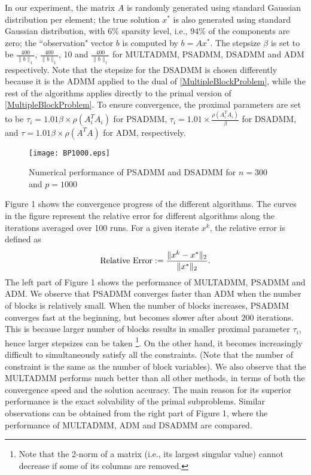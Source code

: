 \documentclass{mcom-l}
\theoremstyle{definition}
\theoremstyle{remark}
\numberwithin{equation}{section}
\begin{document}
In our experiment, the matrix $A$ is randomly generated using standard Gaussian
distribution per element; the true solution $x^*$ is also generated
using standard Gaussian distribution, with $6\%$ sparsity level,
i.e., $94\%$ of the components are zero; the ``observation" vector $b$
is computed by $b = Ax^*$. The stepsize
$\beta$ is set to be $\frac{400}{\|b\|_1}$, $\frac{400}{\|b\|_1}$,
10 and $\frac{400}{\|b\|_1}$ for MULTADMM, PSADMM, DSADMM and ADM
respectively. Note that the stepsize for the DSADMM is chosen differently because it is the ADMM applied to the dual of \eqref{MultipleBlockProblem}, while the rest of the algorithms applies directly to the primal version of \eqref{MultipleBlockProblem}. To ensure convergence, the proximal parameters are set to be
$\tau_i =
1.01\beta\times\rho(A_i^T A_i)$ for PSADMM, $\tau_i =
1.01\times\frac{\rho(A_i^T A_i)}{\beta}$ for DSADMM, and $\tau =
1.01\beta\times\rho(A^T A)$ for ADM, respectively.
\begin{figure}[h]
\centering
\texttt{[image: BP1000.eps]}
\caption{Numerical performance of PSADMM and DSADMM for $n = 300$ and $p = 1000$}
\end{figure}

Figure 1 shows the convergence progress of the different algorithms. The curves in the figure represent the relative error for different algorithms along the iterations averaged over 100 runs. For a given iterate $x^k$, the
relative error is defined as
\begin{equation}\label{RelativeError}
\hbox{Relative Error} := \frac{\|x^k - x^*\|_2}{\|x^*\|_2}.
\end{equation}
The left part of Figure 1 shows the performance of MULTADMM, PSADMM and ADM. We observe that PSADMM converges faster than ADM when the number of blocks is relatively small. When the number of blocks increases, PSADMM converges fast at the beginning, but becomes slower after about $200$ iterations. This is because larger number of blocks results in smaller proximal parameter $\tau_i$, hence larger stepsizes can be taken \footnote{Note that the 2-norm of a matrix  (i.e., its largest singular value) cannot decrease if some of its columns are removed.}. On the other hand, it becomes increasingly difficult to simultaneously satisfy all the constraints. (Note that the number of constraint is the same as the number of block variables). We also observe that the MULTADMM performs much better than all other methods, in terms of both the convergence speed and the solution accuracy. The main reason for its superior performance is the exact solvability of the primal subproblems. Similar observations can be obtained from the right part of Figure 1, where the performance of MULTADMM, ADM and DSADMM are compared.
\end{document}
